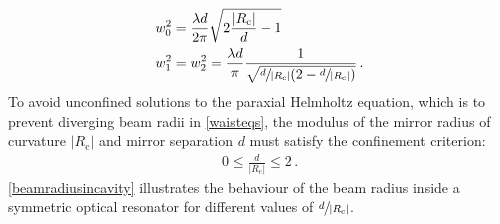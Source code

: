 \documentclass[../Thesis-IJspeert.tex]{subfiles}
\begin{document}
\begin{align}
\label{waisteqs}
\begin{split}
&w_0^2 = \frac{\lambda d}{2\pi}\sqrt{2\frac{\lvert R_\mathrm{c} \rvert}{d} - 1}\\
&w_1^2 = w_2^2 = \frac{\lambda d}{\pi} \frac{1}{\sqrt{\sfrac{d}{\lvert R_\mathrm{c} \rvert}\left( 2 - \sfrac{d}{\lvert R_\mathrm{c} \rvert} \right)}}\,.
\end{split}
\end{align}
To avoid unconfined solutions to the paraxial Helmholtz equation, which is to prevent diverging beam radii in \autoref{waisteqs}, the modulus of the mirror radius of curvature $\lvert R_\mathrm{c} \rvert$ and mirror separation $d$ must satisfy the confinement criterion:
\begin{align}
0 \le \frac{d}{\lvert R_\mathrm{c} \rvert} \le 2\,.
\end{align}
\autoref{beamradiusincavity} illustrates the behaviour of the beam radius inside a symmetric optical resonator for different values of $\sfrac{d}{\lvert R_\mathrm{c} \rvert}$.
\end{document}
